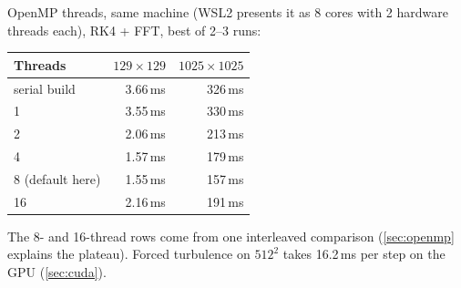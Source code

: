 \documentclass[11pt,a4paper]{article}
\begin{document}
OpenMP threads, same machine (WSL2 presents it as 8 cores with 2 hardware threads each), RK4 + FFT, best of 2--3 runs:
\begin{center}
\begin{tabular}{lrr}
\toprule
Threads & $129\times129$ & $1025\times1025$ \\
\midrule
serial build & 3.66\,ms & 326\,ms \\
1 & 3.55\,ms & 330\,ms \\
2 & 2.06\,ms & 213\,ms \\
4 & 1.57\,ms & 179\,ms \\
8 (default here) & 1.55\,ms & 157\,ms \\
16 & 2.16\,ms & 191\,ms \\
\bottomrule
\end{tabular}
\end{center}
The 8- and 16-thread rows come from one interleaved comparison (\cref{sec:openmp} explains the plateau).  Forced turbulence on $512^2$ takes 16.2\,ms per step on the GPU (\cref{sec:cuda}).
\end{document}
